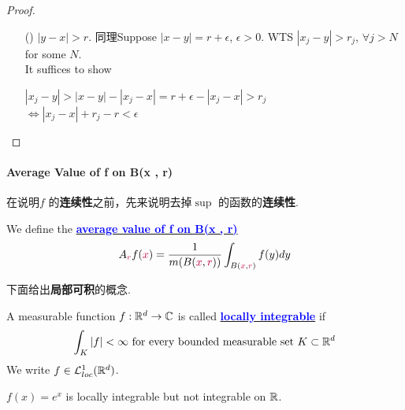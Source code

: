 \begin{proposition}
\begin{proof}
\begin{enumerate}
				\vspace{2em}
				
				\item[(\rmnum{2})]$\left| y - x \right| > r$. 同理Suppose $\left| x - y \right| = r + \epsilon$, $\epsilon > 0$. WTS $\left| x_j - y \right| > r_j$, $\forall j > N$ for some $N$. \\
				It suffices to show
				\begin{center}
					$\left| x_j - y \right| > \left| x - y \right| - \left| x_j - x \right| = r + \epsilon - \left| x_j - x \right| > r_j$ \\
					$\Leftrightarrow \left| x_j - x \right| + r_j - r < \epsilon$
				\end{center}
			\end{enumerate}
		\end{proof}
	\end{proposition}

\newpage
\paragraph{\textbf{Average Value of f on B(x , r)}}
	在说明$f$ 的\textbf{连续性}之前，先来说明去掉$\sup$ 的函数的\textbf{连续性}.
	\begin{defn}\label{def 4.3.1}
		We define the \underline{\textcolor{blue}{\textbf{average value of f on B(x , r)}}}
		\begin{align}
			A_{\textcolor{purple}{r}} f(\textcolor{purple}{x}) = \frac{1}{m(B(\textcolor{purple}{x} , \textcolor{purple}{r}))} \int_{B(\textcolor{purple}{x} , \textcolor{purple}{r})}{f(y) dy}
		\end{align}
	\end{defn}
	
	\vspace{2em}
	下面给出\textbf{局部可积}的概念.
	\begin{defn}\label{def 4.3.2}
		A measurable function $f : \mathbb{R}^d \to \mathbb{C}$ is called \underline{\textcolor{blue}{\textbf{locally integrable}}} if
		\begin{align}
			\int_{K}{\left| f \right|} < \infty \,\, \text{for every bounded measurable set $K \subset \mathbb{R}^d$}
		\end{align}
		We write $f \in \mathcal{L}_{loc}^{1}(\mathbb{R}^d)$.
		
		\vspace{1em}
		\begin{example}\label{ex 4.3.2}
			$f(x) = e^x$ is locally integrable but not integrable on $\mathbb{R}$.
		\end{example}
	\end{defn}

